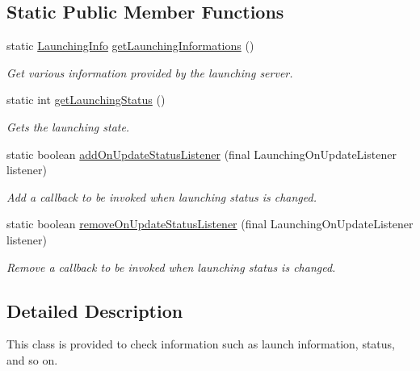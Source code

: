 \subsection*{Static Public Member Functions}
\begin{DoxyCompactItemize}
\item 
static \hyperlink{classcom_1_1toast_1_1android_1_1gamebase_1_1launching_1_1data_1_1_launching_info}{Launching\+Info} \hyperlink{classcom_1_1toast_1_1android_1_1gamebase_1_1_gamebase_1_1_launching_a93ab4a06b72866dace784957cbf218c0}{get\+Launching\+Informations} ()
\begin{DoxyCompactList}\small\item\em Get various information provided by the launching server. \end{DoxyCompactList}\item 
static int \hyperlink{classcom_1_1toast_1_1android_1_1gamebase_1_1_gamebase_1_1_launching_a279d78644ff42918857fcb056a38ff49}{get\+Launching\+Status} ()
\begin{DoxyCompactList}\small\item\em Gets the launching state. \end{DoxyCompactList}\item 
static boolean \hyperlink{classcom_1_1toast_1_1android_1_1gamebase_1_1_gamebase_1_1_launching_a1588ac604f55b5bb65c9748080b66e3f}{add\+On\+Update\+Status\+Listener} (final Launching\+On\+Update\+Listener listener)
\begin{DoxyCompactList}\small\item\em Add a callback to be invoked when launching status is changed. \end{DoxyCompactList}\item 
static boolean \hyperlink{classcom_1_1toast_1_1android_1_1gamebase_1_1_gamebase_1_1_launching_a2a6cf9c9ff4df6e6e91a3225e6291db7}{remove\+On\+Update\+Status\+Listener} (final Launching\+On\+Update\+Listener listener)
\begin{DoxyCompactList}\small\item\em Remove a callback to be invoked when launching status is changed. \end{DoxyCompactList}\end{DoxyCompactItemize}


\subsection{Detailed Description}
This class is provided to check information such as launch information, status, and so on. 

